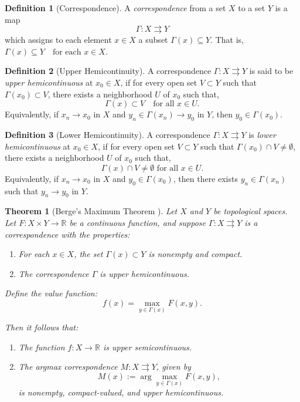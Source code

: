 \documentclass[11pt,letterpaper]{article}
\theoremstyle{definition}
\newtheorem{definition}{Definition}[section]
\theoremstyle{plain}
\newtheorem{theorem}{Theorem}[section]
\begin{document}
\begin{definition}[Correspondence]


A \emph{correspondence} from a set \( X \) to a set \( Y \) is a map
\[
\Gamma: X \rightrightarrows Y
\]
which assigns to each element \( x \in X \) a subset \( \Gamma(x) \subseteq Y \). That is, $\Gamma(x) \subseteq Y \quad \text{for each } x \in X$.

\end{definition}

\begin{definition}[Upper Hemicontinuity]
A correspondence \( \Gamma: X \rightrightarrows Y \) is said to be \emph{upper hemicontinuous} at \( x_0 \in X \), if for every open set \( V \subset Y \) such that \( \Gamma(x_0) \subset V \), there exists a neighborhood \( U \) of \( x_0 \) such that,
\[
\Gamma(x) \subset V \quad \text{for all } x \in U.
\]
Equivalently, if \( x_n \to x_0 \) in \( X \) and \( y_n \in \Gamma(x_n) \to y_0\) in \(Y\), then \( y_0 \in \Gamma(x_0) \).
\end{definition}

\begin{definition}[Lower Hemicontinuity]

A correspondence \( \Gamma: X \rightrightarrows Y \) is \emph{lower hemicontinuous} at \( x_0 \in X \), if for every open set \( V \subset Y \) such that \( \Gamma(x_0) \cap V \neq \emptyset \), there exists a neighborhood \( U \) of \( x_0 \) such that, 
\[
\Gamma(x) \cap V \neq \emptyset \text{ for all } x \in U. 
\]
Equivalently, if \( x_n \to x_0 \) in $X$ and \( y_0 \in \Gamma(x_0) \), then there exists \( y_n \in \Gamma(x_n) \) such that $y_n \to y_0$ in $Y$.
\end{definition}

\begin{theorem}[Berge's Maximum Theorem {\cite{berge63,aliprantis06}}]
Let \( X \) and \( Y \) be topological spaces. Let \( F: X \times Y \to \mathbb{R} \) be a continuous function, and suppose \( \Gamma: X \rightrightarrows Y \) is a correspondence with the properties:

\begin{enumerate}[label=(\roman*)] 
    \item For each \( x \in X \), the set \( \Gamma(x) \subset Y\) is nonempty and compact.
    \item The correspondence \( \Gamma \) is upper hemicontinuous.
\end{enumerate}

Define the value function:
\[
f(x) = \max_{y \in \Gamma(x)} F(x, y).
\]

Then it follows that:
\begin{enumerate}[label=(\roman*)]
    \item The function \( f: X \to \mathbb{R} \) is upper semicontinuous.
    
    \item The argmax correspondence $M:  X\rightrightarrows Y$, given by
    \[
    \displaystyle M(x) := \arg \max_{y \in \Gamma(x)} F(x, y),
    \]
    is nonempty, compact-valued, and upper hemicontinuous.
\end{enumerate}

\end{theorem}
\end{document}
